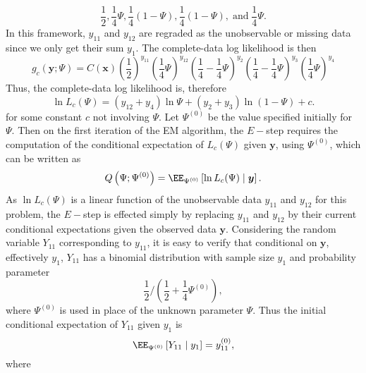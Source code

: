 \begin{exam}
\begin{equation*}
        \frac{1}{2} , \frac{1}{4} \Psi , \frac{1}{4} \left( 1 - \Psi \right) , \frac{1}{4} \left( 1 - \Psi \right), \; \text{and} \; \frac{1}{4} \Psi .
    \end{equation*}
    In this framework, $y_{11}$ and $y_{12}$ are regraded as the unobservable or missing data since we only get their sum $y_1$. The complete-data log likelihood is then
    \begin{equation*}
        g_c (\bm{y} ; \Psi) = C(\bm{x}) \left( \frac{1}{2} \right)^{y_{11}}  \left( \frac{1}{4} \Psi \right)^{y_{12}} \left( \frac{1}{4} - \frac{1}{4} \Psi \right)^{y_2} \left( \frac{1}{4} - \frac{1}{4} \Psi \right)^{y_3} \left( \frac{1}{4} \Psi \right)^{y_4}
    \end{equation*}
    Thus, the complete-data log likelihood is, therefore
    \begin{equation*}
        \ln L_c (\Psi) = (y_{12} + y_{4}) \ln \Psi + (y_{2} + y_{3}) \ln (1 - \Psi) + c.
    \end{equation*}
    for some constant $c$ not involving $\Psi$. Let $\Psi^{(0)}$ be the value specified initially for $\Psi$. Then on the first iteration of the EM algorithm, the $E-$step requires the computation of the conditional expectation of $L_c (\Psi)$ given $\bm{y}$, using $\Psi^{(0)}$, which can be written as
    \begin{equation*}
        Q \left( \Psi ; \Psi^{(0)} \right) = \EE_{\Psi^{(0)}} \left[ \ln L_{c} (\Psi) \mid \bm{y} \right].
    \end{equation*}
    As $\ln L_c (\Psi)$ is a linear function of the unobservable data $y_{11}$ and $y_{12}$ for this problem, the $E-$step is effected simply by replacing $y_{11}$ and $y_{12}$ by their current conditional expectations given the observed data $\bm{y}$. Considering the random variable $Y_{11}$ corresponding to $y_{11}$, it is easy to verify that conditional on $\bm{y}$, effectively $y_1$, $Y_{11}$ has a binomial distribution with sample size $y_1$ and probability parameter
    \begin{equation*}
        \frac{1}{2} / \left( \frac{1}{2} + \frac{1}{4} \Psi^{(0)} \right),
    \end{equation*}
    where $\Psi^{(0)}$ is used in place of the unknown parameter $\Psi$. Thus the initial conditional expectation of $Y_{11}$ given $y_{1}$ is
    \begin{equation*}
        \EE_{\Psi^{(0)}} \left[ Y_{11} \mid y_1 \right] = y_{11}^{(0)},
    \end{equation*}
    where
    \begin{align*}

\end{align*}
\end{exam}
